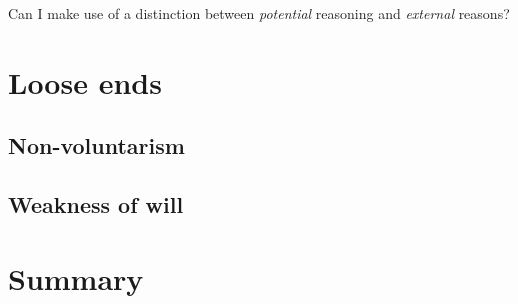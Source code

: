 \documentclass[10pt]{article}
\begin{document}
\begin{note}[Maybe?]
  Can I make use of a distinction between \emph{potential} reasoning and \emph{external} reasons?
\end{note}

\section{Loose ends}
\label{sec:loose-ends}

\subsection{Non-voluntarism}
\label{sec:non-voluntarism}

\subsection{Weakness of will}
\label{sec:weakness-will}

\section{Summary}
\label{sec:summary}

\newpage
\end{document}
